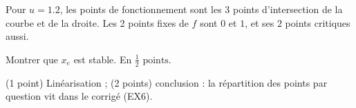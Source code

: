 \documentclass[11pt]{ocots-exam}
\begin{document}
\begin{exercise}[points=8, label=ex:stab]
    Pour $u = 1.2$, les points de fonctionnement sont les 3 points
    d'intersection de la courbe et de la droite. Les 2 points fixes de $f$
    sont $0$ et $1$, et ses $2$ points critiques aussi.
    \begin{question}
        Montrer que $x_e$ est stable. En $\frac{1}{2} \text{ points}$.
    \end{question}
    \begin{correction}
        (1 point) Linéarisation ; (2 points) conclusion : la répartition des
        points par question vit dans le corrigé (EX6).
    \end{correction}
\end{exercise}
\end{document}

